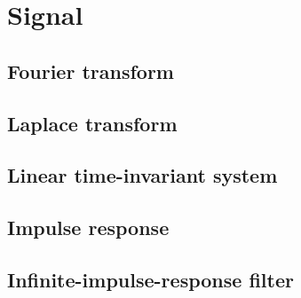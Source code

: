 \chapter{Signal}

\section{Fourier transform}

\section{Laplace transform}

\section{Linear time-invariant system}

\section{Impulse response}

\section{Infinite-impulse-response filter}
